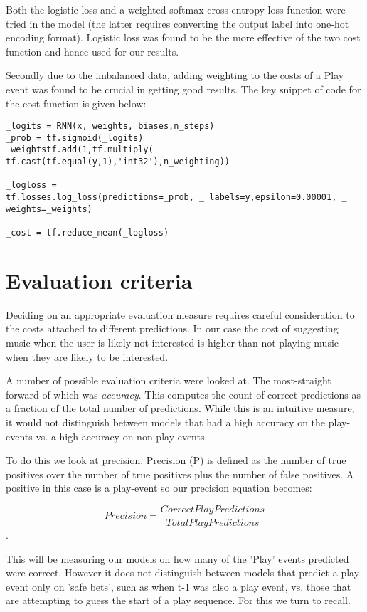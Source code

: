 Both the logistic loss and a weighted softmax cross entropy loss function were tried in the model (the latter requires converting the output label into one-hot encoding format). Logistic loss was found to be the more effective of the two cost function and hence used for our results. 

Secondly due to the imbalanced data, adding weighting to the costs of a Play event was found to be crucial in getting good results. The key snippet of code for the cost function is given below:

\begin{lstlisting}
_logits = RNN(x, weights, biases,n_steps)
_prob = tf.sigmoid(_logits)
_weightstf.add(1,tf.multiply( _
tf.cast(tf.equal(y,1),'int32'),n_weighting))

_logloss =
tf.losses.log_loss(predictions=_prob, _ labels=y,epsilon=0.00001, _ 
weights=_weights)

_cost = tf.reduce_mean(_logloss)
\end{lstlisting}


\section{Evaluation criteria}

Deciding on an appropriate evaluation measure requires careful consideration to the costs attached to different predictions. In our case the cost of suggesting music when the user is likely not interested is higher than not playing music when they are likely to be interested. 

A number of possible evaluation criteria were looked at. The most-straight forward of which was \textit{accuracy}. This computes the count of correct predictions as a fraction of the total number of predictions. While this is an intuitive measure, it would not distinguish between models that had a high accuracy on the play-events vs. a high accuracy on non-play events. 

To do this we look at precision. Precision (P) is defined as the number of true positives over the number of true positives plus the number of false positives. A positive in this case is a play-event so our precision equation becomes:

$$Precision = \frac{Correct Play Predictions}{Total Play Predictions}$$. 

This will be measuring our models on how many of the 'Play' events predicted were correct. However it does not distinguish between models that predict a play event only on 'safe bets', such as when t-1 was also a play event, vs. those that are attempting to guess the start of a play sequence. For this we turn to recall.

